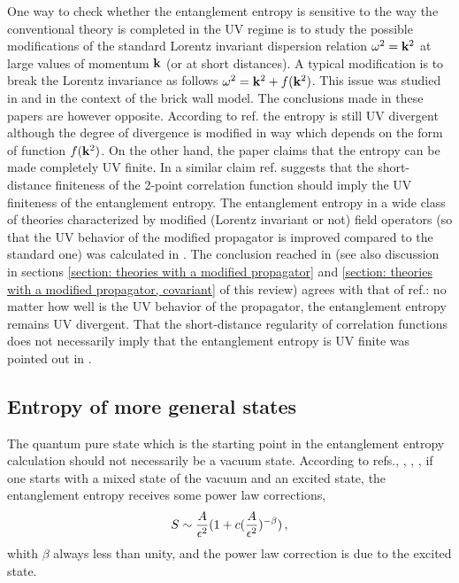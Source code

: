 \documentclass[12pt]{article}
\def\be{\begin{eqnarray}}
\def\ee{\end{eqnarray}}
\def\lb{\label}
\def\o{\over}
\begin{document}
One way to check whether the entanglement entropy is sensitive to  the way the conventional theory is completed in the UV regime is to study the possible modifications of the standard Lorentz invariant   dispersion relation $\omega^2={\bf k}^2$ at large values of momentum $\bf k$ (or at short distances). A typical modification is to break the Lorentz invariance
as follows $\omega^2={\bf k}^2+f({\bf k}^2)$. This issue was studied in \cite{Jacobson:2007jx} and  \cite{Chang:2003sa} in the context of the brick wall model. The conclusions made in these papers are however opposite.
According to ref.\cite{Jacobson:2007jx} the entropy is still UV divergent although the degree of divergence is modified in  way which depends on the form of function $f({\bf k}^2)$.
On the other hand, the paper \cite{Chang:2003sa} claims that the entropy can be made completely UV finite. In a similar claim  ref.\cite{Padmanabhan:2010wg} suggests that
the short-distance finiteness of the 2-point correlation function should imply the UV finiteness of the entanglement entropy.
The entanglement entropy in a wide class of theories characterized by 
modified (Lorentz invariant or not) field operators (so that the UV behavior of the modified propagator is improved compared to the standard one) was calculated in \cite{Nesterov:2010yi}. The conclusion reached in \cite{Nesterov:2010yi} (see also discussion in sections \ref{section: theories with a modified propagator} and \ref{section: theories with a modified propagator, covariant} of this review) agrees with that of ref.\cite{Jacobson:2007jx}: no matter how well is the UV behavior of the propagator, the entanglement entropy remains UV divergent. That the short-distance regularity of correlation functions does not necessarily imply that the entanglement entropy is UV finite was pointed out in \cite{Nesterov:2010jh}.


\subsection{Entropy of more general states} 

The quantum pure state which is  the starting point in the entanglement entropy calculation should not  necessarily be a vacuum state.
According to refs.\cite{Das:2010su}, \cite{Das:2007mj}, \cite{Das:2005ah}, \cite{Das:2008sy}, if one starts with a mixed state of the vacuum and an  excited state, the entanglement entropy receives some power law corrections,
\be
S\sim{A\o \epsilon^2}(1+c ({A\o \epsilon^2})^{-\beta})\, ,
\lb{power law correction}
\ee
whith $\beta$  always less than unity, and  the power law correction is due to the excited state.
\end{document}
